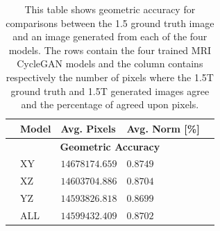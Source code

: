 \documentclass[12pt, fleqn, titlepage]{article}
\newcommand{\1}[1]{\mathds{1}\left[#1\right]}
\begin{document}
\begin{table}[H]
	\begin{center}
		\begin{tabular}{l l l l l}
			\toprule
			& \textbf{Model}   & \textbf{Avg. Pixels} & \textbf{Avg. Norm [\%]}  & \\ \midrule
			&      \multicolumn{3}{c}{\textbf{Geometric Accuracy}}          & \\
			&XY                & $14678174.659$       & $0.8749$            & \\
			&XZ                & $14603704.886$       & $0.8704$            & \\
			&YZ                & $14593826.818$       & $0.8699$            & \\
			&ALL               & $14599432.409$       & $0.8702$            & \\
			\bottomrule
		\end{tabular}
		\caption{This table shows geometric accuracy for comparisons between the 1.5 ground truth image and an image generated from each of the four models. The rows contain the four trained MRI CycleGAN models and the column contains respectively the number of pixels where the 1.5T ground truth and 1.5T generated images agree and the percentage of agreed upon pixels.}
		\label{tab:metrics_geometric_accuracy}
	\end{center}
\end{table}
\end{document}
